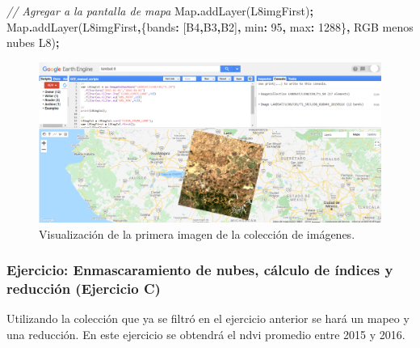 \documentclass[
  12pt,
  letterpaper,
  twoside]{book}
\newenvironment{Shaded}{\begin{snugshade}}{\end{snugshade}}
\newcommand{\BuiltInTok}[1]{#1}
\newcommand{\CommentTok}[1]{\textcolor[rgb]{0.56,0.35,0.01}{\textit{#1}}}
\newcommand{\DataTypeTok}[1]{\textcolor[rgb]{0.13,0.29,0.53}{#1}}
\newcommand{\DecValTok}[1]{\textcolor[rgb]{0.00,0.00,0.81}{#1}}
\newcommand{\FunctionTok}[1]{\textcolor[rgb]{0.00,0.00,0.00}{#1}}
\newcommand{\NormalTok}[1]{#1}
\newcommand{\OperatorTok}[1]{\textcolor[rgb]{0.81,0.36,0.00}{\textbf{#1}}}
\newcommand{\StringTok}[1]{\textcolor[rgb]{0.31,0.60,0.02}{#1}}
\begin{document}
\begin{Shaded}
\begin{Highlighting}[]
\CommentTok{// Agregar a la pantalla de mapa}
\BuiltInTok{Map}\OperatorTok{.}\FunctionTok{addLayer}\NormalTok{(L8imgFirst)}\OperatorTok{;}
\BuiltInTok{Map}\OperatorTok{.}\FunctionTok{addLayer}\NormalTok{(L8imgFirst}\OperatorTok{,}\NormalTok{\{}\DataTypeTok{bands}\OperatorTok{:}\NormalTok{ [}\StringTok{\textquotesingle{}B4\textquotesingle{}}\OperatorTok{,}\StringTok{\textquotesingle{}B3\textquotesingle{}}\OperatorTok{,}\StringTok{\textquotesingle{}B2\textquotesingle{}}\NormalTok{]}\OperatorTok{,} \DataTypeTok{min}\OperatorTok{:} \DecValTok{95}\OperatorTok{,} \DataTypeTok{max}\OperatorTok{:} \DecValTok{1288}\NormalTok{\}}\OperatorTok{,} 
  \StringTok{\textquotesingle{}RGB menos nubes L8\textquotesingle{}}\NormalTok{)}\OperatorTok{;}
\end{Highlighting}
\end{Shaded}

\begin{figure}[btp]

{\centering \includegraphics[width=1\linewidth]{Img/RGBIm} 

}

\caption{Visualización de la primera imagen de la colección de imágenes.}\label{fig:unnamed-chunk-150}
\end{figure}

\hypertarget{ejercicio-enmascaramiento-de-nubes-cuxe1lculo-de-uxedndices-y-reducciuxf3n-ejercicio-c}{%
\subsubsection{Ejercicio: Enmascaramiento de nubes, cálculo de índices y reducción (Ejercicio C)}\label{ejercicio-enmascaramiento-de-nubes-cuxe1lculo-de-uxedndices-y-reducciuxf3n-ejercicio-c}}

Utilizando la colección que ya se filtró en el ejercicio anterior se hará un mapeo y una reducción. En este ejercicio se obtendrá el ndvi promedio entre 2015 y 2016.
\end{document}
